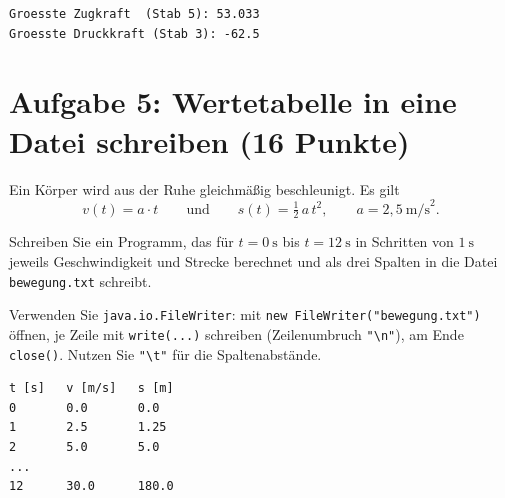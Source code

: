 \documentclass[
	fontsize=12pt,
	paper=a4,
	numbers=noenddot,
	parskip=half,
	openany
]{scrbook}
\begin{document}
\begin{beispiel}
\begin{lstlisting}[language={}]
Groesste Zugkraft  (Stab 5): 53.033
Groesste Druckkraft (Stab 3): -62.5
\end{lstlisting}
\end{beispiel}

\clearpage
\section*{Aufgabe 5: Wertetabelle in eine Datei schreiben \hfill (16 Punkte)}

Ein Körper wird aus der Ruhe gleichmäßig beschleunigt. Es gilt
\[ v(t) = a \cdot t \qquad\text{und}\qquad s(t) = \tfrac{1}{2}\,a\,t^2, \qquad a = 2{,}5~\text{m/s}^2. \]

Schreiben Sie ein Programm, das für $t = 0~\text{s}$ bis $t = 12~\text{s}$ in Schritten von $1~\text{s}$ jeweils Geschwindigkeit und Strecke berechnet und als drei Spalten in die Datei \texttt{bewegung.txt} schreibt.

\begin{hinweis}[Hinweis]
	Verwenden Sie \texttt{java.io.FileWriter}: mit \lstinline|new FileWriter("bewegung.txt")| öffnen, je Zeile mit \texttt{write(...)} schreiben (Zeilenumbruch \lstinline|"\n"|), am Ende \texttt{close()}.
	Nutzen Sie \lstinline|"\t"| für die Spaltenabstände.
\end{hinweis}

\begin{beispiel}
\begin{lstlisting}[language={}]
t [s]   v [m/s]   s [m]
0       0.0       0.0
1       2.5       1.25
2       5.0       5.0
...
12      30.0      180.0
\end{lstlisting}
\end{beispiel}
\end{document}

